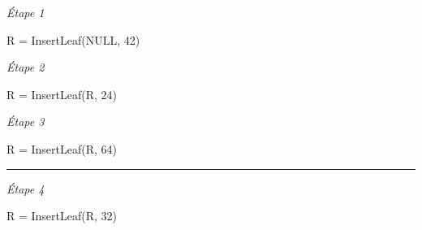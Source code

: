 \documentclass[11pt,a4paper]{article}
\begin{document}
\begin{center}



\begin{table}[ht!]
  \centering
  \begin{minipage}{0.33\textwidth}
    \centering

\textit{\'Etape 1}

R = InsertLeaf(NULL, 42)

\vspace*{3cm}

  \end{minipage}
  \hfillx
  \begin{minipage}{0.33\textwidth}
    \centering

\textit{\'Etape 2}

R = InsertLeaf(R, 24)

\vspace*{3cm}

  \end{minipage}
  \hfillx
  \begin{minipage}{0.33\textwidth}
    \centering

\textit{\'Etape 3}

R = InsertLeaf(R, 64)

\vspace*{3cm}

  \end{minipage}
\end{table}

\vspace*{-0.5cm}
\rule{1.0\linewidth}{0.75pt}



\begin{table}[ht!]
  \centering
  \begin{minipage}{0.33\textwidth}
    \centering

\textit{\'Etape 4}

R = InsertLeaf(R, 32)

\vspace*{6cm}

  \end{minipage}
  \hfillx
  \begin{minipage}{0.33\textwidth}
    \centering


\end{minipage}
\end{table}
\end{center}
\end{document}
